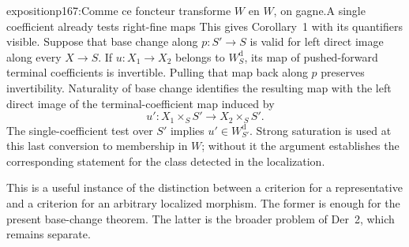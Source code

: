 \begin{dcomment}{exposition}{p167:Comme ce foncteur transforme $W$ en $W$, on gagne.}{A single coefficient already tests right-fine maps}
This gives Corollary~1 with its quantifiers visible. Suppose that base change along $p:S'\to S$ is valid for left direct image along every $X\to S$. If $u:X_1\to X_2$ belongs to $W_S^{\mathrm d}$, its map of pushed-forward terminal coefficients is invertible. Pulling that map back along $p$ preserves invertibility. Naturality of base change identifies the resulting map with the left direct image of the terminal-coefficient map induced by
\[
 u':X_1\times_S S'\longrightarrow X_2\times_S S'.
\]
The single-coefficient test over $S'$ implies $u'\in W_{S'}^{\mathrm d}$. Strong saturation is used at this last conversion to membership in $W$; without it the argument establishes the corresponding statement for the class detected in the localization.

This is a useful instance of the distinction between a criterion for a representative and a criterion for an arbitrary localized morphism. The former is enough for the present base-change theorem. The latter is the broader problem of Der~2, which remains separate.
\end{dcomment}

